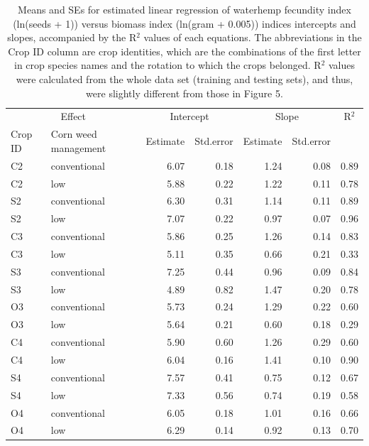 \documentclass[
]{article}
\begin{document}
\begin{table}
\caption{\label{tab:ci-full}Means and SEs for estimated linear regression of waterhemp fecundity index (ln(seeds + 1)) versus biomass index (ln(gram + 0.005)) indices intercepts and slopes, accompanied by the R$^2$ values of each equations. The abbreviations in the Crop ID column are crop identities, which are the combinations of the first letter in crop species names and the rotation to which the crops belonged. R$^2$ values were calculated from the whole data set (training and testing sets), and thus, were slightly different from those in Figure 5.}
\centering
\begin{threeparttable}
\begin{tabular}[t]{llrrrrr}
\toprule
\multicolumn{2}{c}{Effect} & \multicolumn{2}{c}{Intercept} & \multicolumn{2}{c}{Slope} & \multicolumn{1}{c}{R$^2$} \\
\cmidrule(l{3pt}r{3pt}){1-2} \cmidrule(l{3pt}r{3pt}){3-4} \cmidrule(l{3pt}r{3pt}){5-6} \cmidrule(l{3pt}r{3pt}){7-7}
Crop ID & Corn 
 weed management & Estimate & Std.error & Estimate & Std.error &  \\
\midrule
C2 & conventional & 6.07 & 0.18 & 1.24 & 0.08 & 0.89\\
C2 & low & 5.88 & 0.22 & 1.22 & 0.11 & 0.78\\
S2 & conventional & 6.30 & 0.31 & 1.14 & 0.11 & 0.89\\
S2 & low & 7.07 & 0.22 & 0.97 & 0.07 & 0.96\\
C3 & conventional & 5.86 & 0.25 & 1.26 & 0.14 & 0.83\\
C3 & low & 5.11 & 0.35 & 0.66 & 0.21 & 0.33\\
S3 & conventional & 7.25 & 0.44 & 0.96 & 0.09 & 0.84\\
S3 & low & 4.89 & 0.82 & 1.47 & 0.20 & 0.78\\
O3 & conventional & 5.73 & 0.24 & 1.29 & 0.22 & 0.60\\
O3 & low & 5.64 & 0.21 & 0.60 & 0.18 & 0.29\\
C4 & conventional & 5.90 & 0.60 & 1.26 & 0.29 & 0.60\\
C4 & low & 6.04 & 0.16 & 1.41 & 0.10 & 0.90\\
S4 & conventional & 7.57 & 0.41 & 0.75 & 0.12 & 0.67\\
S4 & low & 7.33 & 0.56 & 0.74 & 0.19 & 0.58\\
O4 & conventional & 6.05 & 0.18 & 1.01 & 0.16 & 0.66\\
O4 & low & 6.29 & 0.14 & 0.92 & 0.13 & 0.70\\

\end{tabular}
\end{threeparttable}
\end{table}
\end{document}

